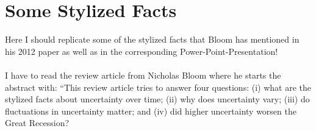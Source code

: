 \documentclass[a4paper,12pt,oneside,pointednumbers,bibtotoc,bigheadings,liststotoc]{scrbook}
\begin{document}
\section{Some Stylized Facts}
Here I should replicate some of the stylized facts that Bloom has mentioned in his 2012 paper as well as in the corresponding Power-Point-Presentation!\\
\\
I have to read the review article from Nicholas Bloom where he starts the abstract with: ``This review article tries to answer four questions: (i) what are the stylized facts about uncertainty over time; (ii) why does uncertainty vary; (iii) do fluctuations in uncertainty matter; and (iv) did higher uncertainty worsen the Great Recession?



\end{document}
